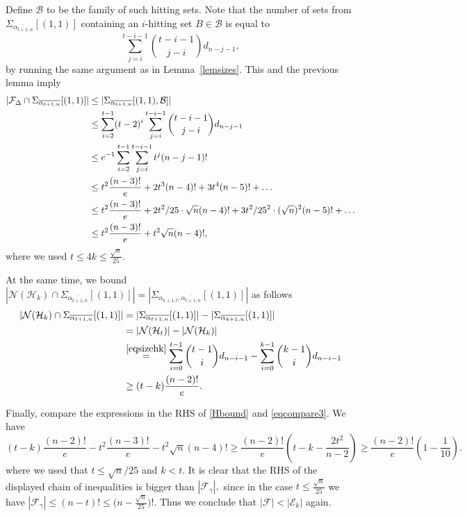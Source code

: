 \documentclass[11pt]{extarticle}
\numberwithin{equation}{section} %
\theoremstyle{plain}
\theoremstyle{definition}
\newcommand{\FF}{\mathcal{F}}
\newcommand{\ff}{\mathcal{F}}
\newcommand{\m}{\mathcal}
\newcommand{\HH}{\mathcal{H}}
\begin{document}
Define $\m B$ to be the family of such hitting sets. Note that the number of sets from $\Sigma_{ \overline{\alpha_{t+1,n}}}[(1,1)]$ containing an $i$-hitting set $B\in \m B$ is equal to 
$$\sum_{j=i}^{t-i-1}{t-i-1\choose j-i}d_{n-j-1},$$
by running the same argument as in Lemma~\ref{lemsizes}. This and the previous  lemma imply
\begin{align} 
\notag|\FF_\Delta \cap \Sigma_{\overline{\alpha_{t+1,n}}}[(1, 1)]| &\leq |\Sigma_{\overline{\alpha_{t+1,n}}}[(1, 1),\m B]|\\
\notag &\le \sum_{i=2}^{t-1} (t-2)^i \sum_{j=i}^{t-i-1}{t-i-1\choose j-i}d_{n-j-1} \notag \\
\notag &\le e^{-1}\sum_{i=2}^{t-1} \sum_{j=i}^{t-i-1}t^j (n-j-1)! \notag \\
&\le t^2\frac{(n-3)!}{e} + 2t^3(n-4)!+3t^4(n-5)!+\dots \notag \\
&\leq t^2\frac{(n-3)!}{e} + 2t^2/25 \cdot \sqrt{n}(n-4)!+3t^2/25^2 \cdot(\sqrt{n})^2 (n-5)!+\dots  \notag \\
\label{eqcompare3} &\leq t^2\frac{(n-3)!}{e}+ t^2 \sqrt{n}(n-4)!,
\end{align}
where we used $t \leq 4k \leq \frac{\sqrt{n}}{25}.$

At the same time,  we bound $|\m{N}(\HH_k)\cap \Sigma_{ \overline{\alpha_{t+1,n}}}[(1, 1)]|=|\Sigma_{ \alpha_{k+1,t}, \overline{\alpha_{t+1,n}}}[(1, 1)]|$ as follows
    \begin{align} \label{hitsetsbounds}
     \notag   |\m{N}(\HH_k)\cap \Sigma_{ \overline{\alpha_{t+1,n}}}[(1, 1)]| &= |\Sigma_{\overline{\alpha_{t+1,n}}}[(1, 1)]| - |\Sigma_{\overline{\alpha_{k+1,n}}}[(1, 1)]|\\
     &=   |\m{N}(\HH_t)|- |\m{N}(\HH_k)|\\
     \notag &\overset{\eqref{eqsizehk}}{=} \sum_{i = 0}^{t-1} {t-1 \choose i} d_{n-i-1} - \sum_{i = 0}^{k-1} {k-1 \choose i} d_{n-i-1} \\
     \label{Hbound}    &\geq (t-k)\frac{(n-2)!}{e}.
    \end{align}



Finally, compare the expressions in the RHS of \eqref{Hbound} and \eqref{eqcompare3}. %
We have 
$$
(t-k)\frac{(n-2)!}{e}-t^2\frac{(n-3)!}{e}-t^2 \sqrt{n}(n-4)! \ge \frac{(n-2)!}{e}\left(t-k-\frac{2t^2}{n-2}\right)\geq \frac{(n-2)!}{e}\left(1-\frac{1}{10}\right).
$$
where we used that $t\le \sqrt n/25$ and $k < t$. It is clear that the RHS of the displayed chain of inequalities is bigger than $|\ff_\gamma|,$ since in the case $t \leq \frac{\sqrt{n}}{25}$ we have $|\FF_\gamma|\leq (n-t)!\leq \Big(n - \frac{\sqrt{n}}{25}\Big)!$. Thus we conclude that $|\ff|<|\m E_k|$ again.  
\end{document}
